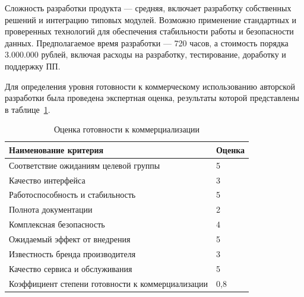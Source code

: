 Сложность разработки продукта --- средняя, включает разработку собственных решений и интеграцию типовых модулей. Возможно применение стандартных и проверенных технологий для обеспечения стабильности работы и безопасности данных. Предполагаемое время разработки --- 720 часов, а стоимость порядка 3.000.000 рублей, включая расходы на разработку, тестирование, доработку и поддержку ПП.

Для определения уровня готовности к коммерческому использованию авторской разработки была проведена экспертная оценка, результаты которой представлены в таблице~\ref{tab:prepare_mark}.

\begin{table}[H]
    \caption{Оценка готовности к коммерциализации}
    \centering

    \emergencystretch=10pt
    \begin{tabular}{@{}ll@{}}
        \toprule
        \textbf{Наименование критерия}                    & \textbf{Оценка} \\ \midrule
        Соответствие ожиданиям целевой группы & 5 \\
        Качество интерфейса & 3 \\
        Работоспособность и стабильность & 5 \\
        Полнота документации & 2 \\
        Комплексная безопасность & 4 \\
        Ожидаемый эффект от внедрения & 5 \\
        Известность бренда производителя & 3 \\
        Качество сервиса и обслуживания & 5 \\ \midrule
        Коэффициент степени готовности к коммерциализации & 0,8 \\ \bottomrule
    \end{tabular}
    \label{tab:prepare_mark}
\end{table}

